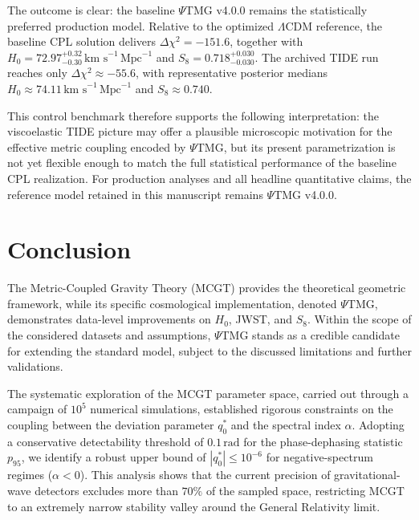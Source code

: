 \documentclass[11pt, a4paper]{article}
\begin{document}
The outcome is clear: the baseline $\Psi$TMG v4.0.0 remains the statistically preferred production model. Relative to the optimized $\Lambda$CDM reference, the baseline CPL solution delivers $\Delta\chi^2 = -151.6$, together with $H_0 = 72.97^{+0.32}_{-0.30}\,\text{km s}^{-1}\,\text{Mpc}^{-1}$ and $S_8 = 0.718^{+0.030}_{-0.030}$. The archived TIDE run reaches only $\Delta\chi^2 \approx -55.6$, with representative posterior medians $H_0 \approx 74.11\,\text{km s}^{-1}\,\text{Mpc}^{-1}$ and $S_8 \approx 0.740$.

This control benchmark therefore supports the following interpretation: the viscoelastic TIDE picture may offer a plausible microscopic motivation for the effective metric coupling encoded by $\Psi$TMG, but its present parametrization is not yet flexible enough to match the full statistical performance of the baseline CPL realization. For production analyses and all headline quantitative claims, the reference model retained in this manuscript remains $\Psi$TMG v4.0.0.

\section{Conclusion}
The Metric-Coupled Gravity Theory (MCGT) provides the theoretical geometric framework, while its specific cosmological implementation, denoted $\Psi$TMG, demonstrates data-level improvements on $H_0$, JWST, and $S_8$. Within the scope of the considered datasets and assumptions, $\Psi$TMG stands as a credible candidate for extending the standard model, subject to the discussed limitations and further validations.

The systematic exploration of the MCGT parameter space, carried out through a campaign of $10^5$ numerical simulations, established rigorous constraints on the coupling between the deviation parameter $q_0^*$ and the spectral index $\alpha$. Adopting a conservative detectability threshold of $0.1\,\mathrm{rad}$ for the phase-dephasing statistic $p_{95}$, we identify a robust upper bound of $|q_0^*| \leq 10^{-6}$ for negative-spectrum regimes ($\alpha < 0$). This analysis shows that the current precision of gravitational-wave detectors excludes more than $70\%$ of the sampled space, restricting MCGT to an extremely narrow stability valley around the General Relativity limit.


\nocite{*}
\begin{flushleft}

\end{flushleft}
\end{document}
